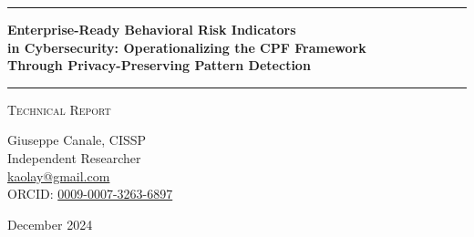 \documentclass[11pt,a4paper]{article}
\begin{document}
\thispagestyle{empty}
\begin{center}

\vspace*{0.5cm}

\rule{\textwidth}{1.5pt}

\vspace{0.5cm}

{\LARGE \textbf{Enterprise-Ready Behavioral Risk Indicators}}\\[0.3cm]
{\LARGE \textbf{in Cybersecurity: Operationalizing the CPF Framework}}\\[0.3cm]
{\LARGE \textbf{Through Privacy-Preserving Pattern Detection}}

\vspace{0.5cm}

\rule{\textwidth}{1.5pt}

\vspace{0.3cm}

{\large \textsc{Technical Report}}

\vspace{0.5cm}

{\Large Giuseppe Canale, CISSP}\\[0.2cm]
Independent Researcher\\[0.1cm]
\href{mailto:kaolay@gmail.com}{kaolay@gmail.com}\\[0.1cm]
ORCID: \href{https://orcid.org/0009-0007-3263-6897}{0009-0007-3263-6897}

\vspace{0.8cm}

{\large December 2024}

\vspace{1cm}

\end{center}
\end{document}
